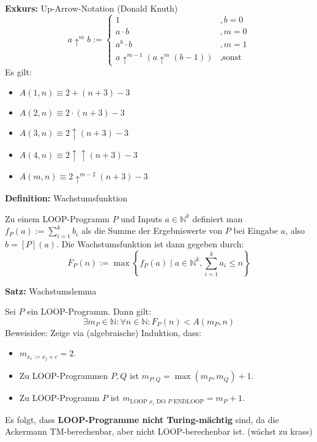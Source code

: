\documentclass[a4paper,graphics,11pt]{article}
\begin{document}
\strut

\textbf{Exkurs:} Up-Arrow-Notation (Donald Knuth)
$$
    a \uparrow^m b :=
    \begin{cases}
        1               &, b = 0\\
        a \cdot b       &, m = 0\\
        a^b \cdot b     &, m = 1\\
        a \uparrow^{m-1}(a \uparrow^m(b-1)) &, \text{sonst}
    \end{cases}
$$
Es gilt:
\begin{itemize}
    \item $A(1,n) \equiv 2 + (n+3) - 3$
    \item $A(2,n) \equiv 2 \cdot (n+3) - 3$
    \item $A(3,n) \equiv 2 \uparrow (n+3) - 3$
    \item $A(4,n) \equiv 2 \uparrow\uparrow (n+3) - 3$
    \item $A(m,n) \equiv 2 \uparrow^{m-2} (n+3) - 3$
\end{itemize}

\newpage

\textbf{Definition:} Wachstumsfunktion

Zu einem LOOP-Programm $P$ und Inputs $a \in \mathbb{N}^k$ definiert man
$
    f_P(a) := \sum_{i=1}^{k} b_i
$
als die Summe der Ergebniswerte von $P$ bei Eingabe $a$, also $b = [P](a)$.
Die Wachstumsfunktion ist dann gegeben durch:
$$
    F_P(n) := \max\left\{f_P(a) \mid a \in \mathbb{N}^k, \sum_{i=1}^{k} a_i \leq n\right\}
$$

\strut

\textbf{Satz:} Wachstumslemma

Sei $P$ ein LOOP-Programm. Dann gilt:
$$
    \exists m_P \in \mathbb{N} : \forall n \in \mathbb{N} : F_P(n) < A(m_P,n)
$$
Beweisidee: Zeige via (algebraische) Induktion, dass:
\begin{itemize}
    \item $m_{x_i := x_j + c} = 2$.
    \item Zu LOOP-Programmen $P,Q$ ist $m_{P;Q} = \max(m_P,m_Q)+1$.
    \item Zu LOOP-Programm $P$ ist $m_{\text{LOOP } x_i \text{ DO } P \text{ ENDLOOP}} = m_P + 1$.
\end{itemize}

Es folgt, dass \textbf{LOOP-Programme nicht Turing-mächtig} sind, da die Ackermann TM-berechenbar,
aber nicht LOOP-berechenbar ist. (wächst zu krass)

\newpage
\end{document}
